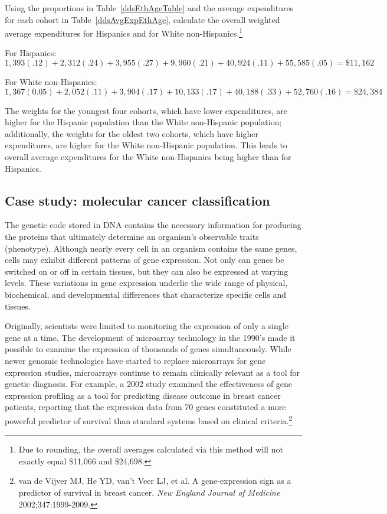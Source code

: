 \begin{example}{Using the proportions in Table~\ref{ddsEthAgeTable} and the average expenditures for each cohort in Table~\ref{ddsAvgExpEthAge}, calculate the overall weighted average expenditures for Hispanics and for White non-Hispanics.\footnote{Due to rounding, the overall averages calculated via this method will not exactly equal \$11,066 and \$24,698.}}

For Hispanics:
\[1,393(.12) + 2,312(.24) + 3,955(.27) + 9,960(.21) + 40,924(.11) + 55,585(.05) = \$11,162 \]

For White non-Hispanics:
\[1,367(0.05) + 2,052(.11) + 3,904(.17) + 10,133(.17) + 40,188(.33) + 52,760(.16) = \$24,384 \]	

The weights for the youngest four cohorts, which have lower expenditures, are higher for the Hispanic population than the White non-Hispanic population; additionally, the weights for the oldest two cohorts, which have higher expenditures, are higher for the White non-Hispanic population. This leads to overall average expenditures for the White non-Hispanics being higher than for Hispanics.
	
\end{example}

\subsection{Case study: molecular cancer classification}

The genetic code stored in DNA contains the necessary information for producing the proteins that ultimately determine an organism's observable traits (phenotype). Although nearly every cell in an organism contains the same genes, cells may exhibit different patterns of gene expression. Not only can genes be switched on or off in certain tissues, but they can also be expressed at varying levels. These variations in gene expression underlie the wide range of physical, biochemical, and developmental differences that characterize specific cells and tissues.

Originally, scientists were limited to monitoring the expression of only a single gene at a time. The development of microarray technology in the 1990's made it possible to examine the expression of thousands of genes simultaneously. While newer genomic technologies have started to replace microarrays for gene expression studies, microarrays continue to remain clinically relevant as a tool for genetic diagnosis. For example, a 2002 study examined the effectiveness of gene expression profiling as a tool for predicting disease outcome in breast cancer patients, reporting that the expression data from 70 genes constituted a more powerful predictor of survival than standard systems based on clinical criteria.\footnote{van de Vijver MJ, He YD, van't Veer LJ, et al. A gene-expression sign as a predictor of survival in breast cancer. \textit{New England Journal of Medicine} 2002;347:1999-2009.} 

